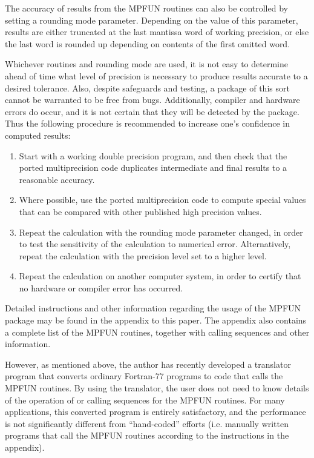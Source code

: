 The accuracy of results from the MPFUN routines can also be controlled
by setting a rounding mode parameter.  Depending on the value of this
parameter, results are either truncated at the last mantissa word of
working precision, or else the last word is rounded up depending on
contents of the first omitted word.

Whichever routines and rounding mode are used, it is not easy to
determine ahead of time what level of precision is necessary to
produce results accurate to a desired tolerance.  Also, despite
safeguards and testing, a package of this sort cannot be warranted to
be free from bugs.  Additionally, compiler and hardware errors do
occur, and it is not certain that they will be detected by the
package.  Thus the following procedure is recommended to increase
one's confidence in computed results:

\begin{enumerate}

\item Start with a working double precision program, and then check
that the ported multiprecision code duplicates intermediate and final
results to a reasonable accuracy.

\item Where possible, use the ported multiprecision code to compute
special values that can be compared with other published high
precision values.

\item Repeat the calculation with the rounding mode parameter changed,
in order to test the sensitivity of the calculation to numerical
error.  Alternatively, repeat the calculation with the precision level
set to a higher level.

\item Repeat the calculation on another computer system, in order to
certify that no hardware or compiler error has occurred.

\end{enumerate}

\vspace{2ex}

Detailed instructions and other information regarding the usage of the
MPFUN package may be found in the appendix to this paper.  The
appendix also contains a complete list of the MPFUN routines, together
with calling sequences and other information.

However, as mentioned above, the author has recently developed a
translator program that converts ordinary Fortran-77 programs to code
that calls the MPFUN routines.  By using the translator, the user does
not need to know details of the operation of or calling sequences for
the MPFUN routines.  For many applications, this converted program is
entirely satisfactory, and the performance is not significantly
different from ``hand-coded'' efforts (i.e. manually written programs
that call the MPFUN routines according to the instructions in the
appendix).

